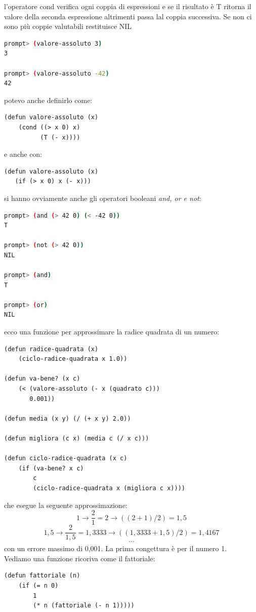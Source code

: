 \documentclass[a4paper,12pt, oneside]{book}
\begin{document}
l'operatore cond verifica ogni coppia di espressioni e se il risultato è T ritorna il valore della seconda espressione altrimenti passa lal coppia successiva. Se non ci sono più coppie valutabili restituisce NIL
\begin{shaded}
	\begin{lstlisting}[language=bash]
prompt> (valore-assoluto 3)
3

prompt> (valore-assoluto -42)
42
\end{lstlisting}
\end{shaded}
potevo anche definirlo come:
\begin{verbatim}
(defun valore-assoluto (x)
    (cond ((> x 0) x)
          (T (- x))))
\end{verbatim}
e anche con:
\begin{verbatim}
(defun valore-assoluto (x)
   (if (> x 0) x (- x)))
\end{verbatim}
si hanno ovviamente anche gli operatori booleani \textit{and, or e not}:
\begin{shaded}
	\begin{lstlisting}[language=bash]
prompt> (and (> 42 0) (< -42 0))
T

prompt> (not (> 42 0))
NIL

prompt> (and)
T

prompt> (or)
NIL
\end{lstlisting}
\end{shaded}
ecco una funzione per approssimare la radice quadrata di un numero:
\begin{verbatim}
(defun radice-quadrata (x)
    (ciclo-radice-quadrata x 1.0))

(defun va-bene? (x c)
    (< (valore-assoluto (- x (quadrato c)))
       0.001))
       
(defun media (x y) (/ (+ x y) 2.0))

(defun migliora (c x) (media c (/ x c)))

(defun ciclo-radice-quadrata (x c)
    (if (va-bene? x c)
        c
        (ciclo-radice-quadrata x (migliora c x))))

\end{verbatim}
che esegue la seguente approssimazione:
$$1\to \frac{2}{1}=2 \to ((2+1)/2)=1,5$$
$$1,5 \to \frac{2}{1,5}=1,3333\to ((1,3333+1,5)/2)=1,4167$$
$$\cdots$$
con un errore massimo di 0,001. La prima congettura è per il numero 1.\\
Vediamo una funzione ricoriva come il fattoriale:
\begin{verbatim}
(defun fattoriale (n)
    (if (= n 0)
        1
        (* n (fattoriale (- n 1)))))
\end{verbatim}
\end{document}
